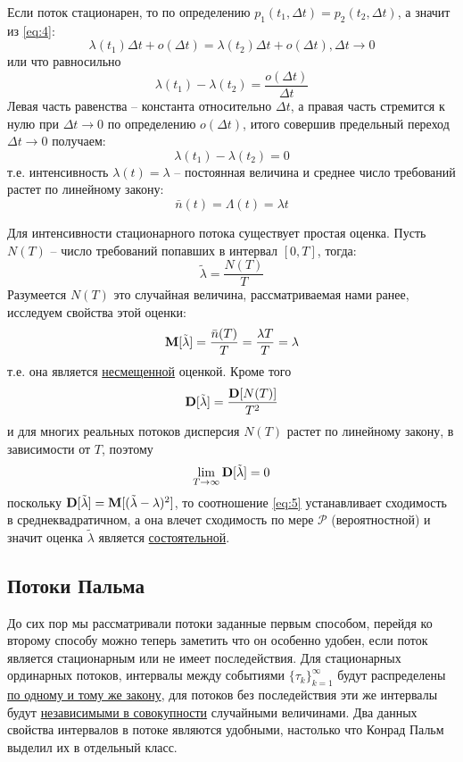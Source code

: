 Если поток стационарен, то по определению $p_1 (t_1, \Delta t) = p_2 (t_2, \Delta t)$, а значит из \eqref{eq:4}:
$$\lambda(t_1) \Delta t + o(\Delta t) = \lambda(t_2) \Delta t + o(\Delta t), \Delta t \to 0$$
или что равносильно
$$\lambda(t_1) - \lambda(t_2) = \frac{o(\Delta t)}{\Delta t}$$
Левая часть равенства -- константа относительно $\Delta t$, а правая часть стремится к нулю при $\Delta t \to 0$ по определению $o(\Delta t)$, итого совершив предельный переход $\Delta t \to 0$ получаем:
$$\lambda(t_1) - \lambda(t_2) = 0$$
т.е. интенсивность $\lambda(t) = \lambda$ -- постоянная величина и среднее число требований растет по линейному закону:
$$\bar{n}(t) = \Lambda(t) = \lambda t$$

Для интенсивности стационарного потока существует простая оценка. Пусть $N(T)$ -- число требований попавших в интервал $[0, T]$, тогда:
$$\tilde{\lambda} = \frac{N(T)}{T}$$
Разумеется $N(T)$ это случайная величина, рассматриваемая нами ранее, исследуем свойства этой оценки:
$$\mathbf{M}[\tilde{\lambda}]= \frac{\bar{n}(T)}{T} = \frac{\lambda T}{T} = \lambda$$
т.е. она является \underline{несмещенной} оценкой. Кроме того
$$\mathbf{D}[\tilde{\lambda}] = \frac{\mathbf{D}[N(T)]}{T^2}$$
и для многих реальных потоков дисперсия $N(T)$ растет по линейному закону, в зависимости от $T$, поэтому
\begin{equation}\label{eq:5}
	\lim_{T \to \infty}{\mathbf{D}[\tilde{\lambda}]} = 0
\end{equation}
поскольку $\mathbf{D}[\tilde{\lambda}] = \mathbf{M}[(\tilde{\lambda} - \lambda)^2]$, то соотношение \eqref{eq:5} устанавливает сходимость в среднеквадратичном, а она влечет сходимость по мере $\mathcal{P}$ (вероятностной) и значит оценка $\tilde{\lambda}$ является \underline{состоятельной}.

\subsection{Потоки Пальма}

До сих пор мы рассматривали потоки заданные первым способом, перейдя ко второму способу можно теперь заметить что он особенно удобен, если поток является стационарным или не имеет последействия. Для стационарных ординарных потоков, интервалы между событиями $\{\tau_k\}_{k=1}^\infty$ будут распределены \underline{по одному и тому же закону}, для потоков без последействия эти же интервалы будут \underline{независимыми в совокупности} случайными величинами. Два данных свойства интервалов в потоке являются удобными, настолько что Конрад Пальм выделил их в отдельный класс.

